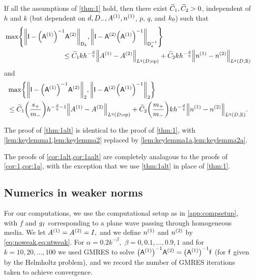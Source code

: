 \begin{theorem}\label{thm:1alt}
If all the assumptions of  \ref{thm:1} hold, then there exist $\widetilde{C}_{1}, \widetilde{C}_{2}>0$, independent of $h$ and $k$ (but dependent on $d, D_{-}, {A}^{(1)}, {n}^{(1)}$, $p$, $q$, and $k_{0}$) such that
\begin{align}\nonumber
&\max\set{\NDk{\Imat - \AmatoI\Amatt},\NDkI{\Imat -\Amatt\AmatoI}}\\
&\hspace{3cm} 
\leq \Cotilde kh^{-\frac{d}q} \NLqDop{\Aso-\Ast} + \Cttilde  kh^{-\frac{d}q}  \NLqDRR{\nso-\nst}
\label{eq:main1alt}
\end{align}
and 
\begin{align}\nonumber
&\max\set{\Nt{\Imat - \AmatoI\Amatt}, \Nt{\Imat -\Amatt\AmatoI}}\\
&\hspace{0cm}
\leq \Cotilde \mleft(\frac{\splus}{\mminus}\mright) h^{-\frac{d}q-1}\NLqDop{\Aso-\Ast} + \Cttilde \mleft(\frac{\mplus}{\mminus}\mright) kh^{-\frac{d}q}\NLqDRR{\nso-\nst}.
\label{eq:main1aalt}
\end{align}
\end{theorem}

The proof of \cref{thm:1alt} is identical to the proof of \cref{thm:1}, with \cref{lem:keylemma1,lem:keylemma2} replaced by \cref{lem:keylemma1a,lem:keylemma2a}.


\label{page:cor1altcor1aaltproof}
The proofs of \cref{cor:1alt,cor:1aalt} are completely analagous to the proofs of \cref{cor:1,cor:1a}, with the exception that we use \cref{thm:1alt} in place of \cref{thm:1}.
\epf


\subsection{Numerics in weaker norms}\label{sec:weakernumerics}
For our computations, we use the computational setup as in \cref{app:compsetup}, with $f$ and $g_{I}$ corresponding to a plane wave passing through homogeneous media.  We let ${A}^{(1)}={A}^{(2)}=I,$ and we define ${n}^{(1)}$ and ${n}^{(2)}$ by \cref{eq:noweak,eq:ntweak}. For $\alpha = 0.2k^{-\beta},$ $\beta = 0,0.1,\ldots,0.9,1$ and for $k=10,20,\ldots,100$ we used GMRES to solve $\AmatoI\Amatt = \AmatoI \fvec$ (for $\mathsf{f}$ given by the Helmholtz problem), and we record the number of GMRES iterations taken to achieve convergence.

